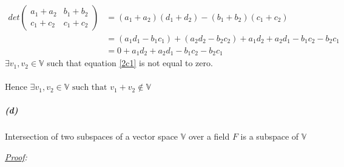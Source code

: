 \documentclass[12pt, letterpaper]{article}
\begin{document}
\begin{enumerate}
\[\begin{split}
    \end{split}
  \]
  \begin{equation}
    \label{2c1}
    \begin{split}
    det\begin{pmatrix}a_1 + a_2 &b_1 + b_2\\c_1 + c_2 &c_1 + c_2\end{pmatrix}
    &= (a_1 + a_2)(d_1 + d_2) - (b_1 + b_2)(c_1 + c_2)\\
    &= (a_1d_1 - b_1c_1) + (a_2d_2 - b_2c_2) + a_1d_2 + a_2d_1 -b_1c_2 -b_2c_1\\
    &= 0 + a_1d_2 + a_2d_1 -b_1c_2 -b_2c_1
    \end{split}
  \end{equation}
  $\exists v_1, v_2 \in \mathbb{V}$ such that equation \ref{2c1} is not equal to zero.\\\\
  Hence $\boxed{\exists v_1,v_2 \in \mathbb{V}\text{ such that }v_1 + v_2 \not \in \mathbb{V}}$
\end{enumerate}

\subparagraph{(d)} Intersection of two subspaces of a vector space $\mathbb{V}$ over a field $F$ is a subspace of $\mathbb{V}$

\textit{\underline{Proof}:}\\
\end{document}
